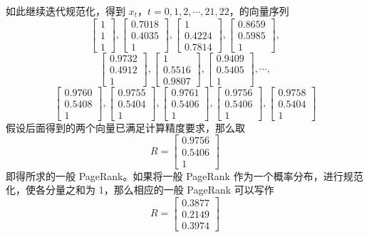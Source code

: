\documentclass[UTF8,12pt,a4paper,fontset=fandol]{ctexart}
\begin{document}
如此继续迭代规范化，得到 $x_t$，$t=0,1,2,\cdots,21,22$，的向量序列
\[
\begin{bmatrix}
1\\
1\\
1
\end{bmatrix},
\begin{bmatrix}
0.7018\\
0.4035\\
1
\end{bmatrix},
\begin{bmatrix}
1\\
0.4224\\
0.7814
\end{bmatrix},
\begin{bmatrix}
0.8659\\
0.5985\\
1
\end{bmatrix},
\]
\[
\begin{bmatrix}
0.9732\\
0.4912\\
1
\end{bmatrix},
\begin{bmatrix}
1\\
0.5516\\
0.9807
\end{bmatrix},
\begin{bmatrix}
0.9409\\
0.5405\\
1
\end{bmatrix},
\cdots,
\]
\[
\begin{bmatrix}
0.9760\\
0.5408\\
1
\end{bmatrix},
\begin{bmatrix}
0.9755\\
0.5404\\
1
\end{bmatrix},
\begin{bmatrix}
0.9761\\
0.5406\\
1
\end{bmatrix},
\begin{bmatrix}
0.9756\\
0.5406\\
1
\end{bmatrix},
\begin{bmatrix}
0.9758\\
0.5404\\
1
\end{bmatrix}
\]
假设后面得到的两个向量已满足计算精度要求，那么取
\[
R=
\begin{bmatrix}
0.9756\\
0.5406\\
1
\end{bmatrix}
\]
即得所求的一般 PageRank。如果将一般 PageRank 作为一个概率分布，进行规范化，使各分量之和为 1，那么相应的一般 PageRank 可以写作
\[
R=
\begin{bmatrix}
0.3877\\
0.2149\\
0.3974
\end{bmatrix}
\]
\end{document}
